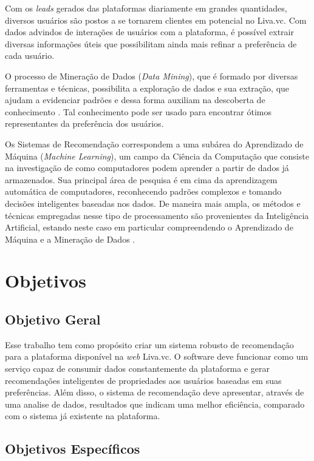 Com os \textit{leads} gerados das plataformas diariamente em grandes quantidades, diversos usuários são postos a se tornarem clientes em potencial no Liva.vc. Com dados advindos de interações de usuários com a plataforma, é possível extrair diversas informações úteis que possibilitam ainda mais refinar a preferência de cada usuário.

O processo de Mineração de Dados (\textit{Data Mining}), que é formado por diversas ferramentas e técnicas, possibilita a exploração de dados e sua extração, que ajudam a evidenciar padrões e dessa forma auxiliam na descoberta de conhecimento \cite{Han:2011:DMC:1972541}. Tal conhecimento pode ser usado para encontrar ótimos representantes da preferência dos usuários.

Os Sistemas de Recomendação correspondem a uma subárea do Aprendizado de Máquina (\textit{Machine Learning}), um campo da Ciência da Computação que consiste na investigação de como computadores podem aprender a partir de dados já armazenados. Sua principal área de pesquisa é em cima da aprendizagem automática de computadores, reconhecendo padrões complexos e tomando decisões inteligentes baseadas nos dados. De maneira mais ampla, os métodos e técnicas empregadas nesse tipo de processamento são provenientes da Inteligência Artificial, estando neste caso em particular compreendendo o Aprendizado de Máquina e a Mineração de Dados \cite{Han:2011:DMC:1972541}.

\section{Objetivos}
\label{section:objetivos}

\subsection{Objetivo Geral}
Esse trabalho tem como propósito criar um sistema robusto de recomendação para a plataforma disponível na \textit{web} Liva.vc. O software deve funcionar como um serviço capaz de consumir dados constantemente da plataforma e gerar recomendações inteligentes de propriedades aos usuários baseadas em suas preferências. Além disso, o sistema de recomendação deve apresentar, através de uma analise de dados, resultados que indicam uma melhor eficiência, comparado com o sistema já existente na plataforma.

\subsection{Objetivos Específicos}


